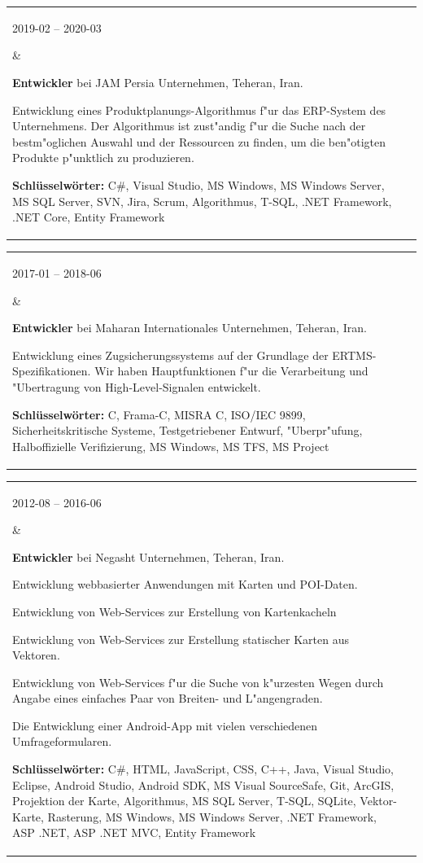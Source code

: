 \documentclass[11pt,a4paper,oneside]{article}
\makeatletter
\newcommand{\keywords}[1]{\textbf{Schl\"{u}sselw\"{o}rter:} #1}
\newenvironment{mytable}{%
\begin{tabular}{@{}l@{\hspace{4mm}}l@{}}%
}{\end{tabular}}
\newcommand{\myitem}[2]{%
\parbox[t]{16mm}{#1}&\parbox[t]{16cm}{#2}\\%
}
\makeatother
\begin{document}
\begin{mytable}
\myitem{2019-02 -- 2020-03}{%
\textbf{Entwickler} bei
JAM Persia Unternehmen, Teheran, Iran.

Entwicklung eines Produktplanungs-Algorithmus f"ur das ERP-System
des Unternehmens.
Der Algorithmus ist zust"andig f"ur die Suche nach der bestm"oglichen
Auswahl und der Ressourcen zu finden, um die ben"otigten Produkte
p"unktlich zu produzieren.

\keywords{%
	C\#, Visual Studio, MS Windows, MS Windows Server,
	MS SQL Server, SVN, Jira, Scrum, Algorithmus, T-SQL,
	.NET Framework, .NET Core, Entity Framework
}
}
\end{mytable}

\begin{mytable}
\myitem{2017-01 -- 2018-06}{
\textbf{Entwickler} bei
Maharan Internationales Unternehmen, Teheran, Iran.

Entwicklung eines Zugsicherungssystems auf der Grundlage
der ERTMS-Spezifikationen.
Wir haben Hauptfunktionen f"ur die Verarbeitung und "Ubertragung
von High-Level-Signalen entwickelt.

\keywords{%
	C, Frama-C, MISRA C, ISO/IEC 9899, Sicherheitskritische Systeme,
	Testgetriebener Entwurf, "Uberpr"ufung,
	Halboffizielle Verifizierung,
	MS Windows, MS TFS, MS Project
}
}
\end{mytable}

\begin{mytable}
\myitem{2012-08 -- 2016-06}{
\textbf{Entwickler} bei
Negasht Unternehmen, Teheran, Iran.

Entwicklung webbasierter Anwendungen mit Karten und POI-Daten.

Entwicklung von Web-Services zur Erstellung von Kartenkacheln

Entwicklung von Web-Services zur Erstellung statischer Karten
aus Vektoren.

Entwicklung von Web-Services f"ur die Suche von k"urzesten Wegen
durch Angabe eines einfaches Paar von Breiten- und L"angengraden.

Die Entwicklung einer Android-App mit vielen verschiedenen
Umfrageformularen.

\keywords{%
	C\#, HTML, JavaScript, CSS, C++, Java, Visual Studio, Eclipse,
	Android Studio, Android SDK, MS Visual SourceSafe, Git, ArcGIS,
	Projektion der Karte, Algorithmus, MS SQL Server, T-SQL, SQLite,
	Vektor-Karte, Rasterung, MS Windows, MS Windows Server,
	.NET Framework, ASP .NET, ASP .NET MVC, Entity Framework
}
}
\end{mytable}
\end{document}
